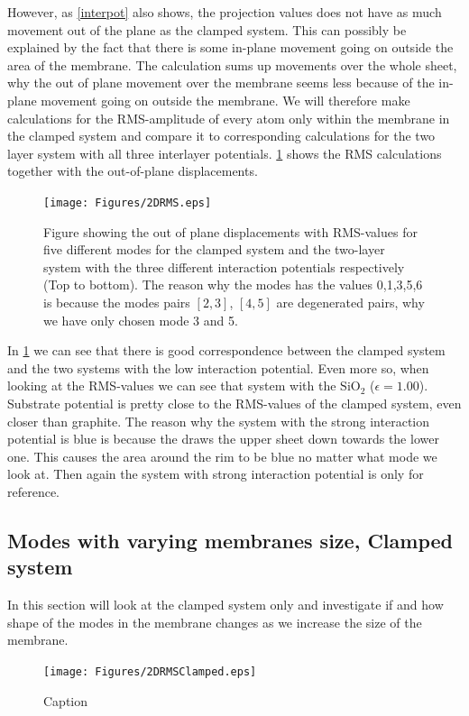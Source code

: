 However, as \cref{interpot} also shows, the projection values does not have as much movement out of the plane as the clamped system. This can possibly be explained by the fact that there is some in-plane movement going on outside the area of the membrane. The calculation sums up movements over the whole sheet, why the out of plane movement over the membrane seems less because of the in-plane movement going on outside the membrane. We will therefore make calculations for the RMS-amplitude of every atom only within the membrane in the clamped system and compare it to corresponding calculations for the two layer system with all three interlayer potentials. \cref{2DRMS} shows the RMS calculations together with the out-of-plane displacements.
\onecolumngrid

\begin{figure}[H]
    \centering
    \texttt{[image: Figures/2DRMS.eps]}
    \caption{Figure showing the out of plane displacements with RMS-values for five different modes for the clamped system and the two-layer system with the three different interaction potentials respectively (Top to bottom). The reason why the modes has the values 0,1,3,5,6 is because the modes pairs $[2,3]$, $[4,5]$ are degenerated pairs, why we have only chosen mode 3 and 5.}
    \label{2DRMS}
\end{figure}
\twocolumngrid

In \cref{2DRMS} we can see that there is good correspondence between the clamped system and the two systems with the low interaction potential. Even more so, when looking at the RMS-values we can see that system with the $\text{SiO}_{2}$ ($\epsilon=1.00$). Substrate potential is pretty close to the RMS-values of the clamped system, even closer than graphite. The reason why the system with the strong interaction potential is blue is because the draws the upper sheet down towards the lower one. This causes the area around the rim to be blue no matter what mode we look at. Then again the system with strong interaction potential is only for reference.
\subsection{Modes with varying membranes size, Clamped system}In this section will look at the clamped system only and investigate if and how shape of the modes in the membrane changes as we increase the size of the membrane.
\onecolumngrid

 \begin{figure}
     \centering
     \texttt{[image: Figures/2DRMSClamped.eps]}
     \caption{Caption}
     \label{BIG}
 \end{figure}
\twocolumngrid

